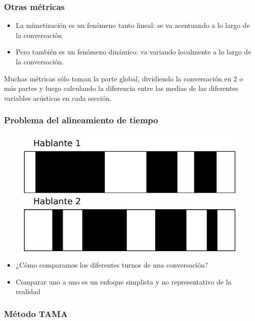 \begin{frame}
  \frametitle{Otras métricas}

  \begin{itemize}
    \item La mimetización es un fenómeno tanto lineal: se va acentuando a lo largo de la conversación
    \item Pero también es un fenómeno dinámico: va variando localmente a lo largo de la conversación.
  \end{itemize}

  Muchas métricas sólo toman la parte global, dividiendo la conversación en 2 o más partes y luego calculando la diferencia entre las medias de las diferentes variables acústicas en cada sección.
\end{frame}


\begin{frame}
  \frametitle{Problema del alineamiento de tiempo}

  \begin{figure}[t]
    \includegraphics[scale=0.40]{images/conversation_turns.pdf}
  \end{figure}

  \begin{itemize}
    \item ¿Cómo comparamos los diferentes turnos de una conversación?
    \item Comparar uno a uno es un enfoque simplista y no representativo de la realidad
  \end{itemize}
\end{frame}

\begin{frame}
  \frametitle{Método TAMA}
\end{frame}


